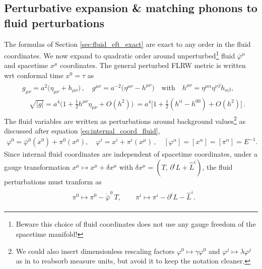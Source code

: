 \subsection{Perturbative expansion \& matching phonons to fluid perturbations}
%
The formulas of Section \ref{sec:fluid_eft_exact} are exact to any order in the fluid coordinates.
We now expand to quadratic order around unperturbed\footnote{Beware this choice of fluid coordinates does not use any gauge freedom of the spacetime manifold!} fluid $\bar{\varphi}^\mu$ and spacetime $x^\mu$ coordinates.
The general perturbed FLRW metric is written wrt conformal time $x^0=\tau$ as
{\small \begin{align}\label{eq:general_perturbed_FLRW_metric}
\begin{aligned}
    &g_{\mu\nu}=a^2\Big(\eta_{\mu\nu}+h_{\mu\nu}\Big)\,,\quad g^{\mu\nu}=a^{-2}\Big(\eta^{\mu\nu}-h^{\mu\nu}\Big)\quad \text{with} \quad h^{\mu\nu}=\eta^{\mu\alpha}\eta^{\nu\beta}h_{\alpha\beta},\\
    &\quad \sqrt{|g|}= a^4\big(1+\tfrac12 h^{\mu\nu}\eta_{\mu\nu} +O(h^2)\big)\ = a^4\Big[1+\tfrac12 (h^{ii}-h^{00}) +O(h^2)\Big]\,.
\end{aligned}
\end{align}}
The fluid variables are written as perturbations around background values\footnote{We could also insert dimensionless rescaling factors $\varphi^0\mapsto \gamma \varphi^0$ and $\varphi^j\mapsto \lambda \varphi^j$ as in \cite{Dubovsky:2005xd} to reabsorb measure units, but avoid it to keep the notation cleaner.} as discussed after equation \eqref{eq:internal_coord_fluid}, 
{\small\begin{align}\label{eq:perturbed_fluid_coordinates}
    \varphi^0=\bar{\varphi}^0(x^0)+\pi^0(x^\mu), \quad \varphi^i=x^i+\pi^i(x^\mu)\,, \quad [\varphi^\alpha]=[x^\alpha]=[\pi^\alpha]=E^{-1}.
\end{align}}
Since internal fluid coordinates are independent of spacetime coordinates, under a gauge transformation $x^\mu \mapsto x^\mu +\delta x^\mu$ with $\delta x^\mu=(T,\,\partial^i L+\hat{L}^i)$, the fluid perturbations must tranform as
{\small\begin{align}\label{eq:gauge_transformation_fluid_perturbations}
\begin{aligned}
    &\pi^0 \mapsto \pi^0 - \dot{\bar{\varphi}}^0\,T,\qquad \pi^i \mapsto \pi^i - \partial^i L - \hat{L}^i.
\end{aligned}\end{align}}
